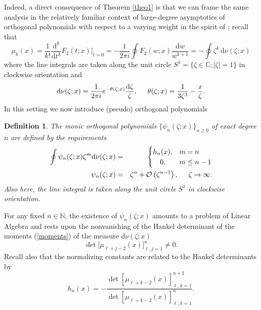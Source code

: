 \documentclass[10pt,oneside,reqno]{amsart}
\numberwithin{equation}{section}
\renewcommand{\d}{{\mathrm d}}
\newtheorem{definition}[theorem]{Definition}
\def\le{\left}
\def\ri{\right}
\def\be{\begin{equation}}
\def\ee{\end{equation}}
\def\N{{\mathbb N}}
\def\eqref#1{(\ref{#1})}
\begin{document}
Indeed, a direct consequence of  Theorem \ref{theo1} is that we can frame the same analysis in the relatively familiar context of large-degree asymptotics of orthogonal polynomials with respect to a varying weight in the spirit of \cite{DKMVZ}; recall that 
\be
  \mu_k(x) = \frac{1}{k!}\frac{\d^k}{\d t^k} F_2(t;x)\Big|_{t=0} = -\frac{1}{2\pi i}\oint F_2(w;x)\frac{\d w}{w^{k+1}} = -
\oint\zeta^{k}\,\d\nu(\zeta;x)
\label{moments}
\ee
where the line integrals are taken along the unit circle $S^1=\{\zeta\in\mathbb{C}: |\zeta|=1\}$ in clockwise orientation and
\begin{equation}\label{meas}
  \d\nu(\zeta;x) = \frac{1}{2\pi i}e^{-\theta(\zeta;x)}\frac{\d\zeta}{\zeta},\hspace{0.5cm} \theta(\zeta;x) = \frac{1}{3\zeta^3}-\frac{x}{\zeta}.
\end{equation}
In this setting we now introduce (pseudo) orthogonal polynomials 
\begin{definition}
 The monic orthogonal polynomials $\{\psi_n(\zeta;x)\}_{n\geq 0}$ of exact degree $n$ are defined by the requirements
\begin{eqnarray}
  \oint\psi_n(\zeta;x)\zeta^m \d\nu(\zeta;x) &=& \begin{cases}
  h_n(x),& m=n\\
  \ \ \ 0,& m\leq n-1\\
  \end{cases}
  \label{o1}\\
  \psi_n(\zeta;x) &=& \zeta^n+\mathcal O\left(\zeta^{n-1}\right),\hspace{0.5cm}\zeta\rightarrow\infty.\label{o2}
\end{eqnarray}
Also here, the line integral is taken along the unit circle $S^1$ in clockwise orientation.
\end{definition}
For any fixed $n\in \N$, the  existence of $\psi_n(\zeta;x)$ amounts to a problem of Linear Algebra and rests upon the nonvanishing of the Hankel determinant of the moments \eqref{moments} of the measure $\d\nu (\zeta;x)$ 
\begin{equation*}
  \det\Big[\mu_{\ell+j-2}(x)\Big]_{\ell,j=1}^n\neq 0.
\end{equation*}
Recall also that the normalizing constants are related to the Hankel determinants by
\begin{equation}\label{hnid}
  h_n(x) = -\frac{\det[\mu_{\ell+k-2}(x)]_{\ell,k=1}^{n+1}}{\det[\mu_{\ell+k-2}(x)]_{\ell,k=1}^n}.
\end{equation}
\end{document}
